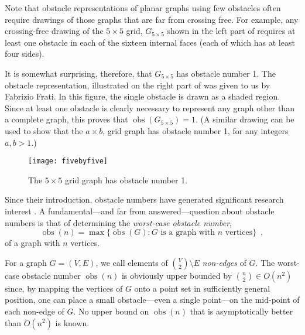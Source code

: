 \documentclass[12pt]{article}
\DeclareMathOperator{\obs}{obs}
\begin{document}
Note that obstacle representations of planar graphs using few obstacles
often require drawings of those graphs that are far from crossing free.
For example, any crossing-free drawing of the $5\times 5$ grid, $G_{5\times 5}$
shown in the left part of  requires at least one
obstacle in each of the sixteen internal faces (each of which has at
least four sides).

It is somewhat surprising, therefore, that $G_{5\times 5}$ has obstacle
number 1.  The obstacle representation, illustrated on the right part of
 was given to us by Fabrizio Frati. In this figure, the
single obstacle is drawn as a shaded region. Since at least one obstacle
is clearly necessary to represent any graph other than a complete graph,
this proves that $\obs(G_{5\times 5}) = 1$.  (A similar drawing can be
used to show that the $a\times b$, grid graph has obstacle number 1,
for any integers $a,b>1$.)

\begin{figure}[hbpt]
  \begin{center}
    \texttt{[image: fivebyfive]}
  \end{center}  
  \caption{The $5\times 5$ grid graph has obstacle number 1.}
\end{figure}

Since their introduction, obstacle numbers have generated significant
research interest 
\cite{%
   fulek.saeedi:convex,%
   johnson.sarioz:computing,%
   mukkamala.pach.ea:lower,%
   mukkamala.pach.ea:graphs,%
   pach.sarioz:small,%
   pach.sarioz:on,%
   sarioz:approximating%
}.
A fundamental---and far from answered---question about obstacle numbers
is that of determining the \emph{worst-case obstacle number},
\[
    \obs(n) = \max \{\obs(G) :\mbox{$G$ is a graph with $n$ vertices}\}
    \enspace ,
\] 
of a graph with $n$ vertices.

For a graph $G=(V,E)$, we call elements of $\binom{V}{2}\setminus E$
\emph{non-edges} of $G$.  The worst-case obstacle number $\obs(n)$ is
obviously upper bounded by $\binom{n}{2}\in O(n^2)$ since, by mapping
the vertices of $G$ onto a point set in sufficiently general position,
one can place a small obstacle---even a single point---on the mid-point
of each non-edge of $G$.  No upper bound on $\obs(n)$ that is asymptotically
better than $O(n^2)$ is known.
\end{document}
